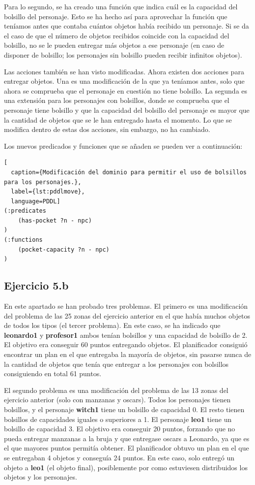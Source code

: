 \documentclass[11pt,a4paper]{article}
\begin{document}
Para lo segundo, se ha creado una función que indica cuál es la capacidad del bolsillo del personaje. Esto se ha hecho así para
aprovechar la función que teníamos antes que contaba cuántos objetos había recibido un personaje. Si se da el caso de que el
número de objetos recibidos coincide con la capacidad del bolsillo, no se le pueden entregar más objetos a ese personaje (en caso
de disponer de bolsillo; los personajes sin bolsillo pueden recibir infinitos objetos).

Las acciones también se han visto modificadas. Ahora existen dos acciones para entregar objetos. Una es una modificación de la que
ya teníamos antes, solo que ahora se comprueba que el personaje en cuestión no tiene bolsillo. La segunda es una extensión para los
personajes con bolsillos, donde se comprueba que el personaje tiene bolsillo y que la capacidad del bolsillo del personaje es mayor
que la cantidad de objetos que se le han entregado hasta el momento. Lo que se modifica dentro de estas dos acciones, sin embargo,
no ha cambiado.

Los nuevos predicados y funciones que se añaden se pueden ver a continuación: 

\begin{algorithm}[H]
\begin{lstlisting}[
  caption={Modificación del dominio para permitir el uso de bolsillos para los personajes.},
  label={lst:pddlmove},
  language=PDDL]
(:predicates
	(has-pocket ?n - npc)
)
(:functions
    (pocket-capacity ?n - npc)
)
\end{lstlisting}
\end{algorithm}

\subsection{Ejercicio 5.b}

En este apartado se han probado tres problemas. El primero es una modificación del problema de las 25 zonas del ejercicio anterior
en el que había muchos objetos de todos los tipos (el tercer problema). En este caso, se ha indicado que \textbf{leonardo1} y
\textbf{profesor1} ambos tenían bolsillos y una capacidad de bolsillo de 2. El objetivo era conseguir 60 puntos entregando objetos.
El planificador consiguió encontrar un plan en el que entregaba la mayoría de objetos, sin pasarse nunca de la cantidad de objetos
que tenía que entregar a los personajes con bolsillos consiguiendo en total 61 puntos.

El segundo problema es una modificación del problema de las 13 zonas del ejercicio anterior (solo con manzanas y oscars). Todos los
personajes tienen bolsillos, y el personaje \textbf{witch1} tiene un bolsillo de capacidad 0. El resto tienen bolsillos de capacidades
iguales o superiores a 1. El personaje \textbf{leo1} tiene un bolsillo de capacidad 3. El objetivo era conseguir 20 puntos, forzando
que no pueda entregar manzanas a la bruja y que entregase oscars a Leonardo, ya que es el que mayores puntos permitía obtener. El
planificador obtuvo un plan en el que se entregaban 4 objetos y conseguía 24 puntos. En este caso, solo entregó un objeto a
\textbf{leo1} (el objeto final), posiblemente por como estuviesen distribuidos los objetos y los personajes.
\end{document}
